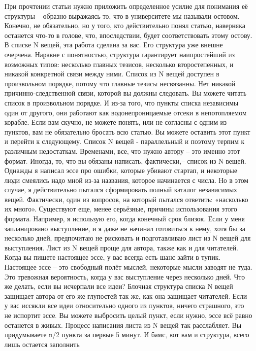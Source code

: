 \documentclass[ebook,12pt,oneside,openany]{memoir}
\begin{document}
При прочтении статьи нужно приложить определенное усилие для понимания
её структуры – образно выражаясь то, что в университете мы называли
остовом. Конечно, не обязательно, но у того, кто действительно понял
статью, наверняка останется что-то в голове, что, впоследствии, будет
соответствовать этому остову. В списке N вещей, эта работа сделана за
вас. Его структура уже внешне очерчена. Наравне с понятностью,
структура гарантирует наипростейший из возможных типов: несколько
главных тезисов, несколько второстепенных, и никакой конкретной связи
между ними. Список из N вещей доступен в произвольном порядке, потому
что главные тезисы несвязанны. Нет никакой причинно-следственной
связи, которой вы должны следовать. Вы можете читать список в
произвольном порядке. И из-за того, что пункты списка независимы один
от другого, они работают как водонепроницаемые отсеки в непотопляемом
корабле. Если вам скучно, не можете понять, или не согласны с одним из
пунктов, вам не обязательно бросать всю статью. Вы можете оставить
этот пункт и перейти к следующему. Список N вещей - параллельный и
поэтому терпим к различным недостаткам. Временами, все, что нужно
автору – это именно этот формат. Иногда, то, что вы обязаны написать,
фактически,– список из N вещей. Однажды я написал эссе про ошибки,
которые убивают стартап, и некоторые люди смеялись надо мной из-за
названия, которое начинается с числа. Но в этом случае, я
действительно пытался сформировать полный каталог независимых вещей.
Фактически, один из вопросов, на который пытался ответить: «насколько
их много». Существуют еще, менее серьёзные, причины использования
этого формата. Например, я использую его, когда конечный срок близок.
Если у меня запланировано выступление, и я даже не начинал готовиться
к нему, хотя бы за несколько дней, предпочитаю не рисковать и
подготавливаю лист из N вещей для выступления. Лист из N вещей проще
для автора, также как и для читателей. Когда вы пишете настоящее эссе,
у вас всегда есть шанс зайти в тупик. Настоящее эссе – это свободный
полёт мыслей, некоторые мысли заводят не туда. Это тревожная
вероятность, когда у вас выступление через несколько дней. Что же
делать, если вы исчерпали все идеи? Блочная структура списка N вещей
защищает автора от его же глупостей так же, как она защищает
читателей. Если у вас иссякли все идеи относительно одного из пунктов,
ничего страшного, это не испортит эссе. Вы можете выбросить целый
пункт, если нужно, эссе всё равно останется в живых. Процесс написания
листа из N вещей так расслабляет. Вы придумываете n/2 пункта за первые
5 минут. И бамс, вот вам и структура, всего лишь остается заполнить
\end{document}
